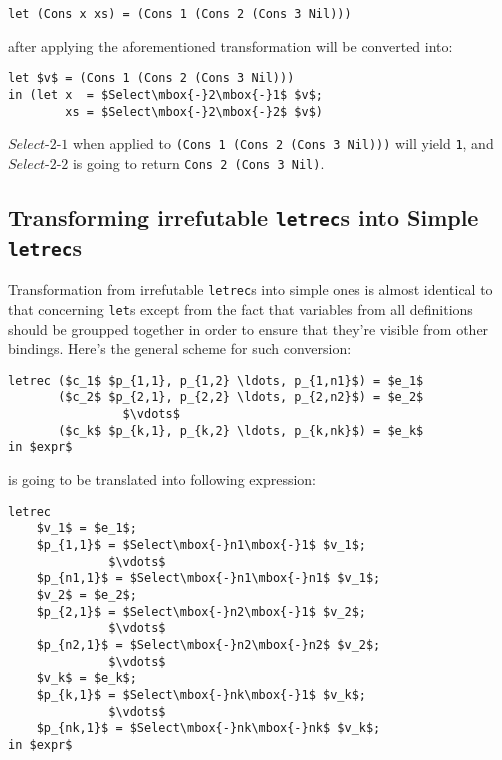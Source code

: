 \documentclass[12pt,a4paper]{report}
\begin{document}
\hspace*{-1.5in}
\begin{lstlisting}[style=haskell,mathescape=true]
let (Cons x xs) = (Cons 1 (Cons 2 (Cons 3 Nil)))
\end{lstlisting}
after applying the aforementioned transformation will be converted into:

\hspace*{-1.5in}
\begin{lstlisting}[style=haskell,mathescape=true]
let $v$ = (Cons 1 (Cons 2 (Cons 3 Nil)))
in (let x  = $Select\mbox{-}2\mbox{-}1$ $v$;
        xs = $Select\mbox{-}2\mbox{-}2$ $v$)
\end{lstlisting}
$Select\mbox{-}2\mbox{-}1$ when applied to \texttt{(Cons 1 (Cons 2 (Cons 3
Nil)))} will yield \texttt{1}, and $Select\mbox{-}2\mbox{-}2$ is going to return
\texttt{Cons 2 (Cons 3 Nil)}.

\subsection{Transforming irrefutable \texttt{letrec}s into Simple \texttt{letrec}s}
Transformation from irrefutable \texttt{letrec}s into simple ones is almost
identical to that concerning \texttt{let}s except from the fact that variables
from all definitions should be groupped together in order to ensure that
they're visible from other bindings. Here's the general scheme for such
conversion:

\hspace*{-1.5in}
\begin{lstlisting}[style=haskell,mathescape=true]
letrec ($c_1$ $p_{1,1}, p_{1,2} \ldots, p_{1,n1}$) = $e_1$
       ($c_2$ $p_{2,1}, p_{2,2} \ldots, p_{2,n2}$) = $e_2$
                $\vdots$
       ($c_k$ $p_{k,1}, p_{k,2} \ldots, p_{k,nk}$) = $e_k$
in $expr$
\end{lstlisting}
is going to be translated into following expression:

\hspace*{-1.5in}
\begin{lstlisting}[style=haskell,mathescape=true]
letrec
    $v_1$ = $e_1$;
    $p_{1,1}$ = $Select\mbox{-}n1\mbox{-}1$ $v_1$;
              $\vdots$
    $p_{n1,1}$ = $Select\mbox{-}n1\mbox{-}n1$ $v_1$;
    $v_2$ = $e_2$;
    $p_{2,1}$ = $Select\mbox{-}n2\mbox{-}1$ $v_2$;
              $\vdots$
    $p_{n2,1}$ = $Select\mbox{-}n2\mbox{-}n2$ $v_2$;
              $\vdots$
    $v_k$ = $e_k$;
    $p_{k,1}$ = $Select\mbox{-}nk\mbox{-}1$ $v_k$;
              $\vdots$
    $p_{nk,1}$ = $Select\mbox{-}nk\mbox{-}nk$ $v_k$;
in $expr$
\end{lstlisting}
\end{document}
